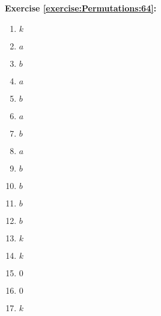 \noindent\textbf{Exercise \ref{exercise:Permutations:64}:}
%
\begin{multicols}{5}
\begin{enumerate}
\item
$k$

\item
$a$

\item
$b$

\item
$a$

\item
$b$

\item
$a$

\item
$b$

\item
$a$

\item
$b$

\item
$b$

\item
$b$

\item
$b$

\item
$k$

\item
$k$

\item
$0$

\item
$0$

\item
$k$
\end{enumerate}
\end{multicols}

